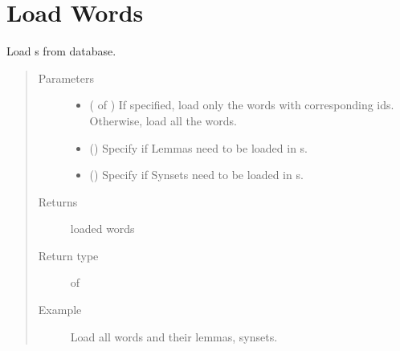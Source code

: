 \documentclass[letterpaper,10pt,english]{sphinxmanual}
\begin{document}
\section{Load Words}
\label{\detokenize{load:module-loacore.load.word_load}}\label{\detokenize{load:load-words}}

\begin{fulllineitems}
\label{\detokenize{load:loacore.load.word_load.load_words}}
Load  s from database.
\begin{quote}\begin{description}
\item[{Parameters}] \leavevmode\begin{itemize}
\item {} 
 ( of ) \textendash{} If specified, load only the words with corresponding ids. Otherwise, load all the words.

\item {} 
 () \textendash{} Specify if Lemmas need to be loaded in  s.

\item {} 
 () \textendash{} Specify if Synsets need to be loaded in  s.

\end{itemize}

\item[{Returns}] \leavevmode
loaded words

\item[{Return type}] \leavevmode
{} of 

\item[{Example}] \leavevmode
Load all words and their lemmas, synsets.


\end{description}
\end{quote}
\end{fulllineitems}
\end{document}
